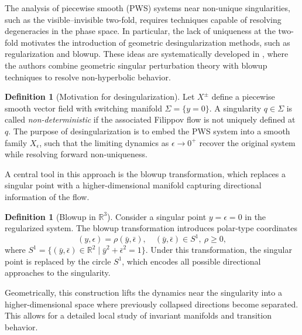 \documentclass[12pt, a4paper, oneside]{book}
\theoremstyle{plain}
\theoremstyle{definition}
\newtheorem{definition}[theorem]{Definition}
\theoremstyle{remark}
\theoremstyle{definition}
\begin{document}
The analysis of piecewise smooth (PWS) systems near non-unique singularities, such as the visible–invisible two-fold, requires techniques capable of resolving degeneracies in the phase space. In particular, the lack of uniqueness at the two-fold motivates the introduction of geometric desingularization methods, such as regularization and blowup. These ideas are systematically developed in \cite{kristiansen2019resolution}, where the authors combine geometric singular perturbation theory with blowup techniques to resolve non-hyperbolic behavior.

\begin{definition}[Motivation for desingularization]
Let $X^\pm$ define a piecewise smooth vector field with switching manifold $\Sigma = \{y=0\}$. A singularity $q \in \Sigma$ is called \emph{non-deterministic} if the associated Filippov flow is not uniquely defined at $q$. The purpose of desingularization is to embed the PWS system into a smooth family $X_\epsilon$, such that the limiting dynamics as $\epsilon \to 0^+$ recover the original system while resolving forward non-uniqueness.
\end{definition}

A central tool in this approach is the blowup transformation, which replaces a singular point with a higher-dimensional manifold capturing directional information of the flow.

\begin{definition}[Blowup in $\mathbb{R}^3$]
Consider a singular point $y=\epsilon=0$ in the regularized system. The blowup transformation introduces polar-type coordinates
\[
(y,\epsilon) = \rho(\bar{y}, \bar{\epsilon}), \quad (\bar{y},\bar{\epsilon}) \in S^1, \ \rho \geq 0,
\]
where $S^1 = \{(\bar{y},\bar{\epsilon}) \in \mathbb{R}^2 \mid \bar{y}^2 + \bar{\epsilon}^2 = 1\}$. Under this transformation, the singular point is replaced by the circle $S^1$, which encodes all possible directional approaches to the singularity.
\end{definition}

Geometrically, this construction lifts the dynamics near the singularity into a higher-dimensional space where previously collapsed directions become separated. This allows for a detailed local study of invariant manifolds and transition behavior.
\end{document}
